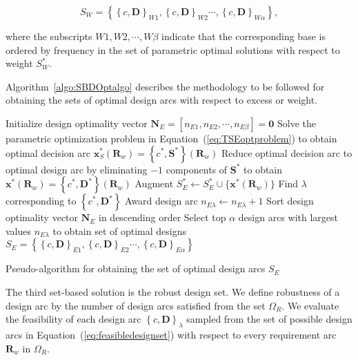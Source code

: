 \begin{equation} \label{eq:SBDweight}
	S_W = \left\{\left\{c,\mathbf{D}\right\}_{W1},\left\{c,\mathbf{D}\right\}_{W2}\cdots,\left\{c,\mathbf{D}\right\}_{W\alpha}\right\},
\end{equation}

where the subscripts $W1,W2,\cdots,W\beta$ indicate that the corresponding base is ordered by frequency in the set of parametric optimal solutions with respect to weight $S_W^*$.

Algorithm~\ref{algo:SBDOptalgo} describes the methodology to be followed for obtaining the sets of optimal design arcs with respect to excess or weight.

\begin{algorithm}
	\DontPrintSemicolon %
	Initialize design optimality vector $\mathbf{N}_E = \left[n_{E1},n_{E2},\cdots,n_{E\beta}\right] = \mathbf{0}$\;	
	 {
		Solve the parametric optimization problem in Equation~(\ref{eq:TSEoptproblem}) to obtain optimal decision arc $\mathbf{x}_S^*(\mathbf{R}_w) = \left\{c^*,\mathbf{S}^*\right\}(\mathbf{R}_w)$\;
		Reduce optimal decision arc to optimal design arc by eliminating $-1$ components of $\mathbf{S}^*$ to obtain $\mathbf{x}^*(\mathbf{R}_w) = \left\{c^*,\mathbf{D}^*\right\}(\mathbf{R}_w)$\;
		Augment $S_{E}^* \gets S_{E}^* \cup \{ \mathbf{x}^*(\mathbf{R}_w) \} $\;
		Find $\lambda$ corresponding to $\left\{c^*,\mathbf{D}^*\right\}$\;
		Award design arc $n_{E\lambda} \gets n_{E\lambda} + 1$\;
	}
	Sort design optimality vector $\mathbf{N}_E$ in descending order\;
	Select top $\alpha$ design arcs with largest values $n_{E\lambda}$ to obtain set of optimal designs $S_E = \left\{\left\{c,\mathbf{D}\right\}_{E1},\left\{c,\mathbf{D}\right\}_{E2}\cdots,\left\{c,\mathbf{D}\right\}_{E\alpha}\right\}$\;
	\caption{Pseudo-algorithm for obtaining the set of optimal design arcs $S_{E}$}
	\label{algo:SBDOptalgo}
\end{algorithm}

The third set-based solution is the robust design set. We define robustness of a design arc by the number of design arcs satisfied from the set $\Omega_R$. We evaluate the feasibility of each design arc $\left\{c,\mathbf{D}\right\}_\lambda$ sampled from the set of possible design arcs in Equation~(\ref{eq:feasibledesignset}) with respect to every requirement arc $\mathbf{R}_w$ in $\Omega_R$.

